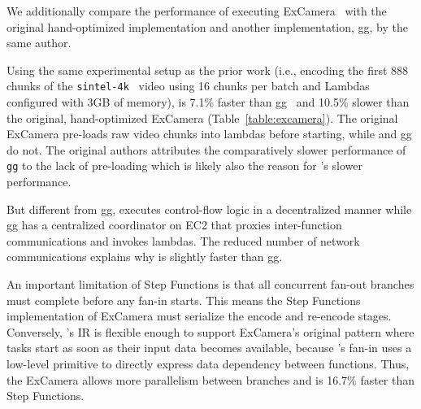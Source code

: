 

We additionally compare the performance of executing ExCamera~\cite{excamera}
with the original hand-optimized implementation and another implementation,
gg, by the same author.

Using the same experimental setup as the prior work (i.e., encoding the first
888 chunks of the \texttt{sintel-4k}~\cite{sintel} video using 16 chunks per
batch and Lambdas configured with 3GB of memory), \name{} is 7.1\% faster than
gg~\cite{gg-atc} and 10.5\% slower than the original, hand-optimized ExCamera
(Table~\ref{table:excamera}). The original ExCamera pre-loads raw video chunks
into lambdas before starting, while \name{} and gg do not. The original
authors attributes the comparatively slower performance of \texttt{gg} to the
lack of pre-loading which is likely also the reason for \name{}'s slower
performance.

But different from gg, \name{} executes control-flow logic in a decentralized
manner while gg has a centralized coordinator on EC2 that proxies
inter-function communications and invokes lambdas. The reduced number of
network communications explains why \name{} is slightly faster than gg.

An important limitation of Step Functions is that all concurrent fan-out
branches must complete before any fan-in starts. This means the Step Functions
implementation of ExCamera must serialize the encode and re-encode stages.
Conversely, \name{}'s IR is flexible enough to support ExCamera's original
pattern where tasks start as soon as their input data becomes available,
because \name{}'s fan-in uses a low-level primitive to directly express data
dependency between functions. Thus, the \name{} ExCamera allows more
parallelism between branches and is 16.7\% faster than Step Functions.

